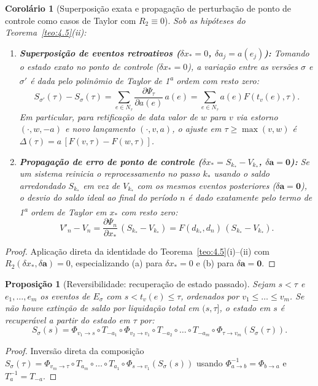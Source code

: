 \documentclass[11pt, a4paper]{article}
\theoremstyle{definition}
\theoremstyle{plain}
\newtheorem{proposicao}[definicao]{Proposição}
\newtheorem{corolario}[definicao]{Corolário}
\theoremstyle{remark}
\begin{document}
\begin{corolario}[Superposição exata e propagação de perturbação de ponto de controle como casos de Taylor com $R_2 \equiv 0$]\label{cor:4.7}
Sob as hipóteses do Teorema~\ref{teo:4.5}(ii):
\begin{enumerate}[label=(\alph*)]
    \item \textbf{Superposição de eventos retroativos ($\delta x_* = 0$, $\delta a_j = a(e_j)$):} Tomando o estado exato no ponto de controle ($\delta x_* = 0$), a variação entre as versões $\sigma$ e $\sigma'$ é dada pelo polinômio de Taylor de 1\textsuperscript{a} ordem com resto zero:
    \[
    S_{\sigma'}(\tau) - S_\sigma(\tau) = \sum_{e \in N_\tau} \frac{\partial \Psi_\tau}{\partial a(e)}\,a(e) = \sum_{e \in N_\tau} a(e) F(t_v(e), \tau).
    \]
    Em particular, para retificação de data valor de $w$ para $v$ via estorno $(\cdot, w, -a)$ e novo lançamento $(\cdot, v, a)$, o ajuste em $\tau \ge \max(v, w)$ é $\Delta(\tau) = a\,[F(v, \tau) - F(w, \tau)]$.
    \item \textbf{Propagação de erro de ponto de controle ($\delta x_* = S_{k_*} - V_{k_*}$, $\delta\mathbf{a} = \mathbf{0}$):} Se um sistema reinicia o reprocessamento no passo $k_*$ usando o saldo arredondado $S_{k_*}$ em vez de $V_{k_*}$ com os mesmos eventos posteriores ($\delta\mathbf{a} = \mathbf{0}$), o desvio do saldo ideal ao final do período $n$ é dado exatamente pelo termo de 1\textsuperscript{a} ordem de Taylor em $x_*$ com resto zero:
    \[
    V'_n - V_n = \frac{\partial \Psi_n}{\partial x_*}\,(S_{k_*} - V_{k_*}) = F(d_{k_*}, d_n)\,(S_{k_*} - V_{k_*}).
    \]
\end{enumerate}
\end{corolario}
\begin{proof}
Aplicação direta da identidade do Teorema~\ref{teo:4.5}(i)--(ii) com $R_2(\delta x_*, \delta\mathbf{a}) = 0$, especializando (a) para $\delta x_* = 0$ e (b) para $\delta\mathbf{a} = \mathbf{0}$.
\end{proof}

\begin{proposicao}[Reversibilidade: recuperação de estado passado]\label{prop:4.8}
Sejam $s < \tau$ e $e_1, \dots, e_m$ os eventos de $E_\sigma$ com $s < t_v(e) \le \tau$, ordenados por $v_1 \le \dots \le v_m$. Se não houve extinção de saldo por liquidação total em $(s, \tau]$, o estado em $s$ é recuperável a partir do estado em $\tau$ por:
\[
S_\sigma(s) = \Phi_{v_1 \to s} \circ T_{-a_1} \circ \Phi_{v_2 \to v_1} \circ T_{-a_2} \circ \dots \circ T_{-a_m} \circ \Phi_{\tau \to v_m}(S_\sigma(\tau)).
\]
\end{proposicao}
\begin{proof}
Inversão direta da composição $S_\sigma(\tau) = \Phi_{v_m \to \tau} \circ T_{a_m} \circ \dots \circ T_{a_1} \circ \Phi_{s \to v_1}(S_\sigma(s))$ usando $\Phi_{a \to b}^{-1} = \Phi_{b \to a}$ e $T_a^{-1} = T_{-a}$.
\end{proof}
\end{document}
